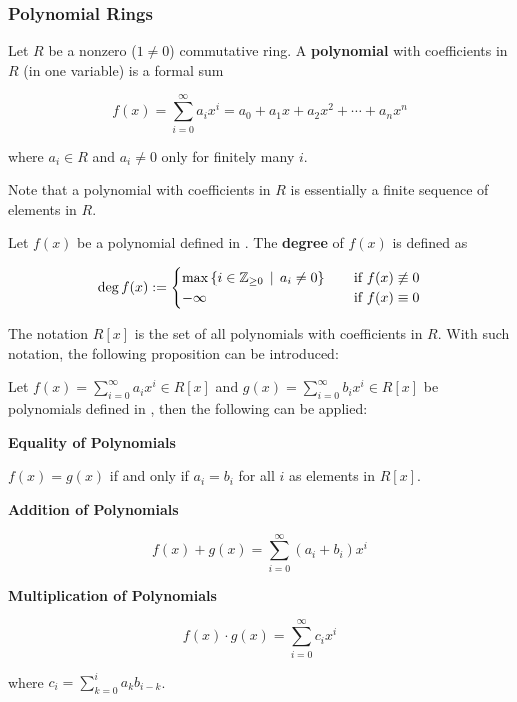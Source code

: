 \documentclass[a4paper,12pt]{article}
\begin{document}
\subsubsection{Polynomial Rings}
\begin{dft}
  Let $R$ be a nonzero ($1\neq 0$) commutative ring. A \textbf{polynomial} with coefficients in $R$ (in one variable) is a formal sum

  $$f(x)=\sum_{i=0}^{\infty}a_{i}x^{i}=a_{0}+a_{1}x+a_{2}x^{2}+\cdots+a_{n}x^{n}$$\s

  where $a_{i}\in R$ and $a_{i}\neq 0$ only for finitely many $i$.
\end{dft}\n

Note that a polynomial with coefficients in $R$ is essentially a finite sequence of elements in $R$.\n

\begin{dft}
  Let $f(x)$ be a polynomial defined in \rdft[\sctd{1}]. The \textbf{degree} of $f(x)$ is defined as

  $$\deg f(x):=\begin{cases}
    \max\left\{ i\in\mathbb{Z}_{\geq 0}\,\mid\, a_{i}\neq 0\right\}&\;\;\;\;\text{if }f(x)\not\equiv 0\\
    -\infty&\;\;\;\;\text{if }f(x)\equiv 0
  \end{cases}$$
\end{dft}\n

The notation $R[x]$ is the set of all polynomials with coefficients in $R$. With such notation, the following proposition can be introduced:\n

\begin{pst}
  Let $f(x)=\sum_{i=0}^{\infty}a_{i}x^{i}\in R[x]$ and $g(x)=\sum_{i=0}^{\infty}b_{i}x^{i}\in R[x]$ be polynomials defined in \rdft[\sctd{2}], then the following can be applied:

  \begin{alist}
    \item \textbf{Equality of Polynomials}\n

    $f(x)=g(x)$ if and only if $a_{i}=b_{i}$ for all $i$ as elements in $R[x]$.
    \item \textbf{Addition of Polynomials}\n

    $$f(x)+g(x)=\sum_{i=0}^{\infty}(a_{i}+b_{i})x^{i}$$

    \item \textbf{Multiplication of Polynomials}\n

    $$f(x)\cdot g(x)=\sum_{i=0}^{\infty}c_{i}x^{i}$$\s

    where $c_{i}=\sum_{k=0}^{i}a_{k}b_{i-k}$.
  \end{alist}
\end{pst}\n
\end{document}
